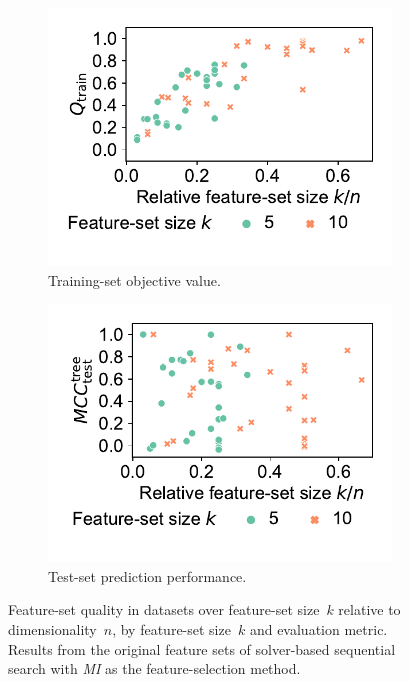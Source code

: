 \documentclass{article}
\theoremstyle{definition}
\begin{document}
\begin{figure}[t]
	\centering
	\begin{subfigure}[t]{0.48\textwidth}
		\centering
		\includegraphics[width=\textwidth, trim=15 30 15 15, clip]{plots/afs-impact-dataset-k-train-objective.pdf}
		\caption{Training-set objective value.}
		\label{fig:afs:impact-dataset-k-train-objective}
	\end{subfigure}
	\hfill
	\begin{subfigure}[t]{0.48\textwidth}
		\centering
		\includegraphics[width=\textwidth, trim=15 30 15 15, clip]{plots/afs-impact-dataset-k-decision-tree-test-mcc.pdf}
		\caption{Test-set prediction performance.}
		\label{fig:afs:impact-dataset-k-decision-tree-test-mcc}
	\end{subfigure}
	\caption{
		Feature-set quality in datasets over feature-set size~$k$ relative to dimensionality~$n$, by feature-set size~$k$ and evaluation metric.
		Results from the original feature sets of solver-based sequential search with \emph{MI} as the feature-selection method.
	}
	\label{fig:afs:impact-dataset-k-quality}
\end{figure}
\end{document}
